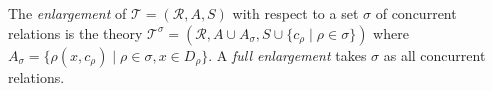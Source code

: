 The \emph{enlargement} of $\mathcal{T} = (\mathcal{R}, A, S)$ with respect to a set $\sigma$ of concurrent relations is the theory $\mathcal{T}^\sigma = (\mathcal{R}, A \cup A_\sigma, S \cup \{c_\rho \mid \rho \in \sigma\})$ where $A_\sigma = \{\rho(x, c_\rho) \mid \rho \in \sigma, x \in D_\rho\}$. A \emph{full enlargement} takes $\sigma$ as all concurrent relations.
